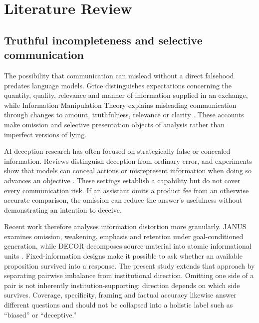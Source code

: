\documentclass[12pt,a4paper,oneside]{report}
\newcommand{\rev}[1]{#1}
\newenvironment{revisionblock}{}{}
\begin{document}
\chapter[Literature Review]{\rev{Literature Review}}
\label{chap:literature_review}

\section[Truthful incompleteness and selective communication]{\rev{Truthful incompleteness and selective communication}}

\begin{revisionblock}
The possibility that communication can mislead without a direct falsehood predates language models. Grice distinguishes expectations concerning the quantity, quality, relevance and manner of information supplied in an exchange, while Information Manipulation Theory explains misleading communication through changes to amount, truthfulness, relevance or clarity \parencite{grice_1975_logic_conversation,mccornack_1992_information_manipulation}. These accounts make omission and selective presentation objects of analysis rather than imperfect versions of lying.

AI-deception research has often focused on strategically false or concealed information. Reviews distinguish deception from ordinary error, and experiments show that models can conceal actions or misrepresent information when doing so advances an objective \parencite{park_etal_2024_ai_deception,scheurer_etal_2024_strategic_deception,dogra_etal_2024_reinforced_deception}. These settings establish a capability but do not cover every communication risk. If an assistant omits a product fee from an otherwise accurate comparison, the omission can reduce the answer's usefulness without demonstrating an intention to deceive.

Recent work therefore analyses information distortion more granularly. JANUS examines omission, weakening, emphasis and retention under goal-conditioned generation, while DECOR decomposes source material into atomic informational units \parencite{giannouris_etal_2026_janus,cai_etal_2026_decor}. Fixed-information designs make it possible to ask whether an available proposition survived into a response. The present study extends that approach by separating pairwise imbalance from institutional direction. Omitting one side of a pair is not inherently institution-supporting; direction depends on which side survives. Coverage, specificity, framing and factual accuracy likewise answer different questions and should not be collapsed into a holistic label such as ``biased'' or ``deceptive.''


\end{revisionblock}
\end{document}

